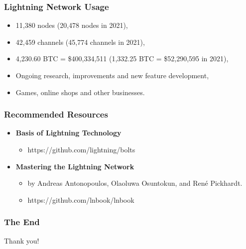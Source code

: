 \documentclass{beamer}
\begin{document}
\begin{frame}
  \frametitle{Lightning Network Usage}
  \begin{itemize}
  \item 11,380 nodes (20,478 nodes in 2021),
  \item 42,459 channels (45,774 channels in 2021),
  \item 4,230.60 BTC = \$400,334,511 (1,332.25 BTC = \$52,290,595 in 2021),
  \item Ongoing research, improvements and new feature development,
  \item Games, online shops and other businesses.
  \end{itemize}
\end{frame}

\begin{frame}
  \frametitle{Recommended Resources}
  \begin{itemize}
  \item \textbf{Basis of Lightning Technology}
    \begin{itemize}
    \item  https://github.com/lightning/bolts
    \end{itemize}
  \item \textbf{Mastering the Lightning Network}
    \begin{itemize}
    \item by Andreas Antonopoulos, Olaoluwa Osuntokun, and René Pickhardt.
    \item https://github.com/lnbook/lnbook
    \end{itemize}
  \end{itemize}
\end{frame}

\begin{frame}
  \frametitle{The End}
  \begin{center}
    Thank you!
  \end{center}
\end{frame}
\end{document}
